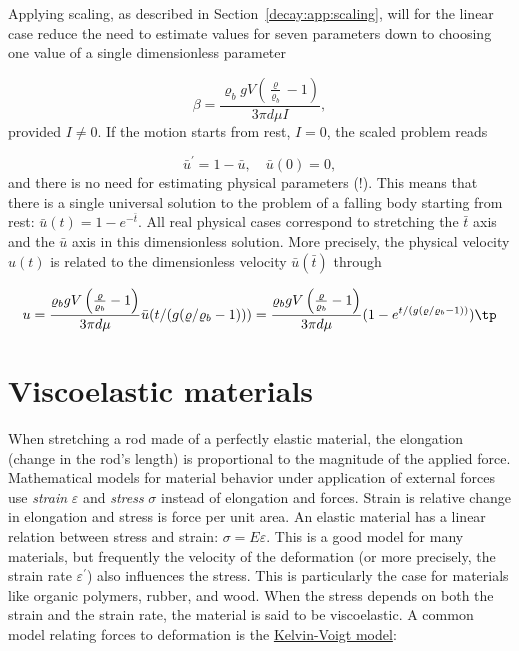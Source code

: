\documentclass[graybox,sectrefs,envcountresetchap,open=right,final]{svmonodo}
\begin{document}
Applying scaling, as described in Section~\ref{decay:app:scaling},
will for the linear case reduce the need to estimate values for
seven parameters down to choosing one value of a single dimensionless parameter

\[ \beta = \frac{\varrho_b gV\left(\frac{\varrho}{\varrho_b} -1\right)}{3\pi d\mu I},\]
provided $I\neq 0$. If the motion starts from rest, $I=0$, the scaled
problem reads

\[ \bar u^{\prime}=1-\bar u, \quad \bar u(0)=0,\]
and there is
no need for estimating physical parameters (!).
This means that there is a single universal solution to the problem
of a falling body starting from rest:
$\bar u(t) = 1 - e^{-\bar t}$. All real
physical cases correspond to stretching the $\bar t$ axis and the $\bar u$
axis in this dimensionless solution. More precisely, the physical velocity
$u(t)$ is related to the dimensionless velocity $\bar u(\bar t)$ through

\[ u = \frac{\varrho_bgV\left(\frac{\varrho}{\varrho_b} -1\right)}{3\pi d\mu}\bar u(t/(g(\varrho/\varrho_b -1))) =
\frac{\varrho_bgV\left(\frac{\varrho}{\varrho_b} -1\right)}{3\pi d\mu}(1 -
e^{t/(g(\varrho/\varrho_b -1))})\tp\]

\section{Viscoelastic materials}
\label{decay:app:viscoelasticity}


When stretching a rod made of a perfectly elastic material, the
elongation (change in the rod's
length) is proportional to the magnitude of the applied force.
Mathematical models for material behavior under application of
external forces use \emph{strain} $\varepsilon$
and \emph{stress} $\sigma$ instead of elongation and
forces. Strain is relative change in elongation and stress is force
per unit area. An elastic material has a linear relation between
stress and strain:  $\sigma = E\varepsilon$. This is a good model
for many materials, but frequently the velocity of the deformation
(or more precisely, the strain rate $\varepsilon^{\prime}$)
also influences the stress. This is particularly the case for
materials like organic polymers, rubber, and wood. When the stress
depends on both the strain and the strain rate, the material is
said to be viscoelastic. A common model relating forces to deformation
is the \href{{https://en.wikipedia.org/wiki/Kelvin-Voigt_material}}{Kelvin-Voigt model}:
\end{document}
